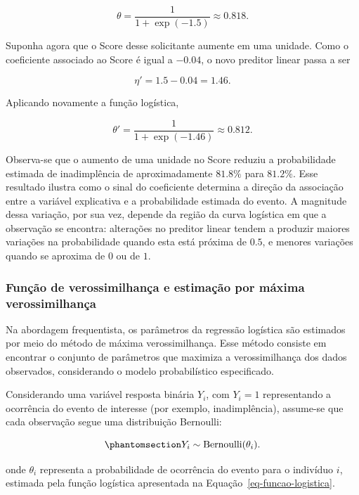 \documentclass[
  brazilian,
  12pt,
  letterpaper,
  DIV=11,
  numbers=noendperiod]{scrartcl}
\begin{document}
\[
\theta = \frac{1}{1+\exp(-1.5)} \approx 0.818.
\]

Suponha agora que o Score desse solicitante aumente em uma unidade. Como
o coeficiente associado ao Score é igual a \(-0.04\), o novo preditor
linear passa a ser

\[
\eta' = 1.5 - 0.04 = 1.46.
\]

Aplicando novamente a função logística,

\[
\theta' = \frac{1}{1+\exp(-1.46)} \approx 0.812.
\]

Observa-se que o aumento de uma unidade no Score reduziu a probabilidade
estimada de inadimplência de aproximadamente \(81.8\%\) para \(81.2\%\).
Esse resultado ilustra como o sinal do coeficiente determina a direção
da associação entre a variável explicativa e a probabilidade estimada do
evento. A magnitude dessa variação, por sua vez, depende da região da
curva logística em que a observação se encontra: alterações no preditor
linear tendem a produzir maiores variações na probabilidade quando esta
está próxima de \(0.5\), e menores variações quando se aproxima de \(0\)
ou de \(1\).

\subsubsection{Função de verossimilhança e estimação por máxima
verossimilhança}\label{funuxe7uxe3o-de-verossimilhanuxe7a-e-estimauxe7uxe3o-por-muxe1xima-verossimilhanuxe7a}

Na abordagem frequentista, os parâmetros da regressão logística são
estimados por meio do método de máxima verossimilhança. Esse método
consiste em encontrar o conjunto de parâmetros que maximiza a
verossimilhança dos dados observados, considerando o modelo
probabilístico especificado.

Considerando uma variável resposta binária \(Y_i\), com \(Y_i=1\)
representando a ocorrência do evento de interesse (por exemplo,
inadimplência), assume-se que cada observação segue uma distribuição
Bernoulli:

\begin{equation}\protect\phantomsection\label{eq-bernoulli-logistica}{
Y_i \sim \operatorname{Bernoulli}(\theta_i).
}\end{equation}

onde \(\theta_i\) representa a probabilidade de ocorrência do evento
para o indivíduo \(i\), estimada pela função logística apresentada na
Equação~\ref{eq-funcao-logistica}.
\end{document}
